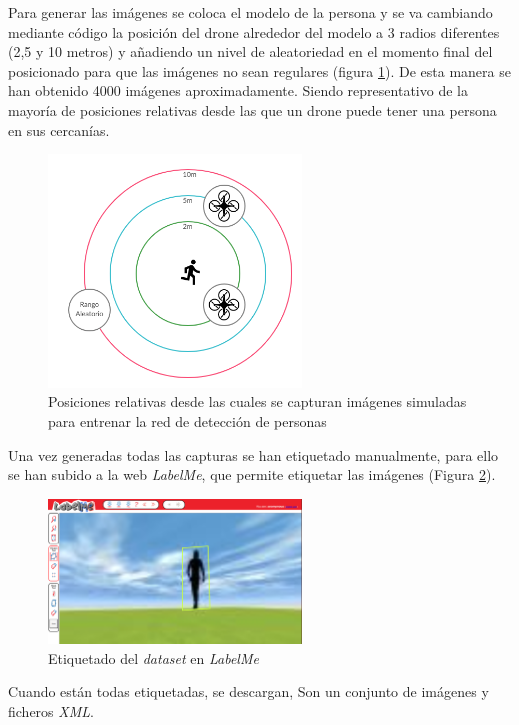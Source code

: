 Para generar las imágenes se coloca el modelo de la persona y se va cambiando mediante código la posición del drone alrededor del modelo a 3 radios diferentes (2,5 y 10 metros) y añadiendo un nivel de aleatoriedad en el momento final del posicionado para que las imágenes no sean regulares (figura \ref{fig:esquemaCapturas}).
De esta manera se han obtenido 4000 imágenes aproximadamente. Siendo representativo de la mayoría de posiciones relativas desde las que un drone puede
tener una persona en sus cercanías. 
\begin{figure}[H]
  \begin{center}
    \includegraphics[width=0.6\textwidth]{figures/simulado/capturas.png}
		\caption{Posiciones relativas desde las cuales se capturan imágenes simuladas para entrenar la red de detección de personas}
		\label{fig:esquemaCapturas}
		\end{center}
\end{figure}
Una vez generadas todas las capturas se han etiquetado manualmente, para ello se han subido a la web \textit{LabelMe}, que permite etiquetar las imágenes (Figura \ref{fig:datasetlabelme}).
\begin{figure}[H]
  \begin{center}
    \includegraphics[width=0.6\textwidth]{figures/herramientas/labelme.png}
		\caption{Etiquetado del \textit{dataset} en  \textit{LabelMe}}
		\label{fig:datasetlabelme}
		\end{center}
\end{figure}
Cuando están todas etiquetadas, se descargan, Son un conjunto de imágenes y ficheros \textit{XML}.

